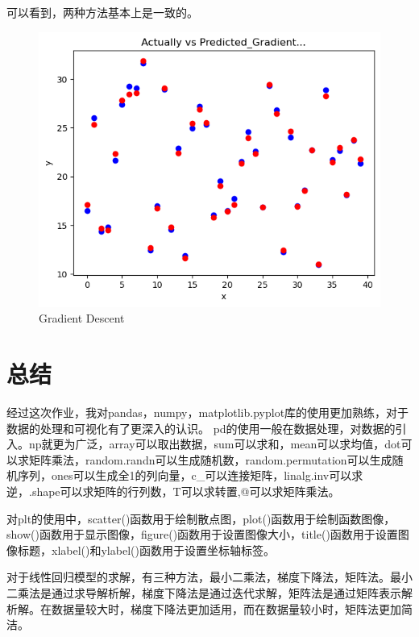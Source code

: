 \documentclass[12pt,a4paper,oneside]{article}
\begin{document}
可以看到，两种方法基本上是一致的。
\begin{figure}[H]
    \centering
    \begin{minipage}[b]{0.6\textwidth}
        \centering
        \includegraphics[width=\textwidth]{3G.png}
        \caption{Gradient Descent}
        \label{fig:code}
    \end{minipage}
\end{figure}
\section{总结}
经过这次作业，我对pandas，numpy，matplotlib.pyplot库的使用更加熟练，对于数据的处理和可视化有了更深入的认识。
pd的使用一般在数据处理，对数据的引入。np就更为广泛，array可以取出数据，sum可以求和，mean可以求均值，dot可以求矩阵乘法，random.randn可以生成随机数，random.permutation可以生成随机序列，ones可以生成全1的列向量，c\_可以连接矩阵，linalg.inv可以求逆，.shape可以求矩阵的行列数，T可以求转置,@可以求矩阵乘法。

对plt的使用中，scatter()函数用于绘制散点图，plot()函数用于绘制函数图像，show()函数用于显示图像，figure()函数用于设置图像大小，title()函数用于设置图像标题，xlabel()和ylabel()函数用于设置坐标轴标签。

对于线性回归模型的求解，有三种方法，最小二乘法，梯度下降法，矩阵法。最小二乘法是通过求导解析解，梯度下降法是通过迭代求解，矩阵法是通过矩阵表示解析解。在数据量较大时，梯度下降法更加适用，而在数据量较小时，矩阵法更加简洁。
\end{document}
